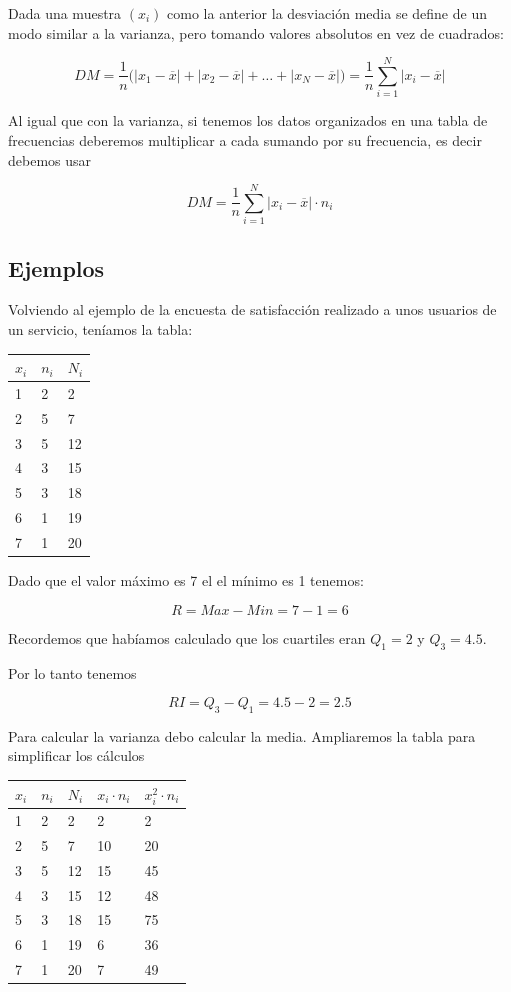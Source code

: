 \documentclass[
]{article}
\begin{document}
Dada una muestra \((x_i)\) como la anterior la desviación media se
define de un modo similar a la varianza, pero tomando valores absolutos
en vez de cuadrados:

\[DM = \frac{1}{n}\big( |x_1 - \overline x| + |x_2 - \overline x| + \ldots + |x_N - \overline x| \big)= \frac{1}{n}\sum^N_{i=1} |x_i - \overline x|\]

Al igual que con la varianza, si tenemos los datos organizados en una
tabla de frecuencias deberemos multiplicar a cada sumando por su
frecuencia, es decir debemos usar

\[DM = \frac{1}{n}\sum^N_{i=1} |x_i - \overline x| \cdot n_i\]

\hypertarget{ejemplos-2}{%
\subsection{Ejemplos}\label{ejemplos-2}}

Volviendo al ejemplo de la encuesta de satisfacción realizado a unos
usuarios de un servicio, teníamos la tabla:

\begin{longtable}[]{@{}lll@{}}
\toprule
\(x_i\) & \(n_i\) & \(N_i\)\tabularnewline
\midrule
\endhead
1 & 2 & 2\tabularnewline
2 & 5 & 7\tabularnewline
3 & 5 & 12\tabularnewline
4 & 3 & 15\tabularnewline
5 & 3 & 18\tabularnewline
6 & 1 & 19\tabularnewline
7 & 1 & 20\tabularnewline
\bottomrule
\end{longtable}

Dado que el valor máximo es 7 el el mínimo es 1 tenemos:

\[R=Max - Min = 7-1=6\]

Recordemos que habíamos calculado que los cuartiles eran \(Q_1 =2\) y
\(Q_3 = 4.5\).

Por lo tanto tenemos

\[RI= Q_3 - Q_1 = 4.5 -2 = 2.5\]

Para calcular la varianza debo calcular la media. Ampliaremos la tabla
para simplificar los cálculos

\begin{longtable}[]{@{}lllll@{}}
\toprule
\(x_i\) & \(n_i\) & \(N_i\) & \(x_i \cdot n_i\) &
\(x_i^2 \cdot n_i\)\tabularnewline
\midrule
\endhead
1 & 2 & 2 & 2 & 2\tabularnewline
2 & 5 & 7 & 10 & 20\tabularnewline
3 & 5 & 12 & 15 & 45\tabularnewline
4 & 3 & 15 & 12 & 48\tabularnewline
5 & 3 & 18 & 15 & 75\tabularnewline
6 & 1 & 19 & 6 & 36\tabularnewline
7 & 1 & 20 & 7 & 49\tabularnewline
\bottomrule
\end{longtable}
\end{document}
